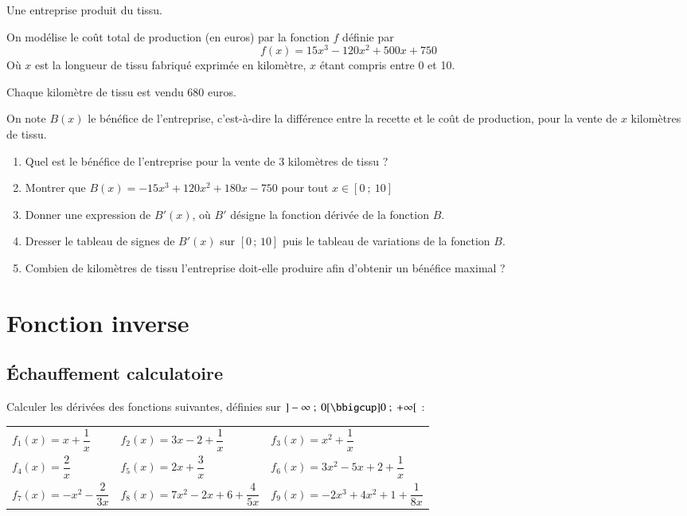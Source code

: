 \documentclass[oneside,12pt]{article}          %
\begin{document}
Une entreprise produit du tissu.

On modélise le coût total de production (en euros) par la fonction $f$ définie par
$$f(x) = 15x^3 - 120x^2 + 500x + 750$$
Où $x$ est la longueur de tissu fabriqué exprimée en kilomètre, $x$ étant compris entre 0 et 10.

Chaque kilomètre de tissu est vendu 680 euros.

On note $B(x)$ le bénéfice de l'entreprise, c'est-à-dire la différence entre la recette et le coût de production, pour la vente de $x$ kilomètres de tissu.
\begin{enumerate}[itemsep = 0pt]
    \item Quel est le bénéfice de l'entreprise pour la vente de 3 kilomètres de tissu ?
    \item Montrer que $B(x)=-15x^3+120x^2+180x-750$ \quad pour tout $x \in [0 ~;~ 10]$
    \item Donner une expression de $B'(x)$, où $B'$ désigne la fonction dérivée de la fonction $B$.
    \item Dresser le tableau de signes de $B'(x)$ sur $[0\,;\,10]$ puis le tableau de variations de la fonction $B$.
    \item Combien de kilomètres de tissu l'entreprise doit-elle produire afin d'obtenir un bénéfice maximal ?
\end{enumerate}



\section{Fonction inverse}

\subsection{Échauffement calculatoire}
Calculer les dérivées des fonctions suivantes, définies sur $]-\infty ~;~ 0[\bbigcup]0 ~;~ +\infty[$ :

\renewcommand{\arraystretch}{2}
\begin{tabular}{p{} p{} p{}}
	$f_1(x)=x+\dfrac{1}{x}$ &
	$f_2(x)=3x-2+\dfrac{1}{x}$ &
	$f_3(x)=x^2+\dfrac{1}{x}$ \\
	$f_4(x)=\dfrac{2}{x}$ &
	$f_5(x)=2x+\dfrac{3}{x}$ &
	$f_6(x)=3x^2-5x+2+\dfrac{1}{x}$ \\
	$f_7(x)=-x^2-\dfrac{2}{3x}$ &
	$f_8(x)=7x^2-2x+6+\dfrac{4}{5x}$ &
	$f_9(x)=-2x^3+4x^2+1+\dfrac{1}{8x}$
\end{tabular}
\end{document}
